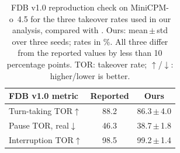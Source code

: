 
\begin{table}[tbp]
\centering
\footnotesize
\setlength{\tabcolsep}{6pt}
\renewcommand{\arraystretch}{1.12}
\begin{tabular}{@{}lcc@{}}
\toprule
\rowcolor{tablehead}
FDB v1.0 metric & Reported & Ours \\
\midrule
Turn-taking TOR$\uparrow$
  & 88.2 & 86.3\,$\pm$\,4.0 \\
\midrule[0.25pt]
Pause TOR, real$\downarrow$
  & 46.3 & 38.7\,$\pm$\,1.8 \\
\midrule[0.25pt]
Interruption TOR$\uparrow$
  & 98.5 & 99.2\,$\pm$\,1.4 \\
\bottomrule
\end{tabular}

\caption{
FDB v1.0 reproduction check on MiniCPM-o~4.5
for the three takeover rates used in our analysis,
compared with \citet[Table~1]{adaptduplex2026}.
Ours: mean\,$\pm$\,std over three seeds;
rates in \%.
All three differ from the reported values by
less than 10 percentage points.
TOR: takeover rate;
$\uparrow$/$\downarrow$: higher/lower is better.
}
\label{tab:calibration}
\end{table}
